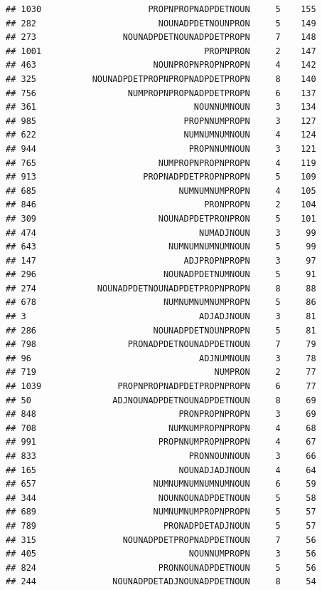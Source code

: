 \documentclass[]{article}
\begin{document}
\begin{verbatim}
## 1030                     PROPNPROPNADPDETNOUN     5    155
## 282                        NOUNADPDETNOUNPRON     5    149
## 273                 NOUNADPDETNOUNADPDETPROPN     7    148
## 1001                                PROPNPRON     2    147
## 463                       NOUNPROPNPROPNPROPN     4    142
## 325           NOUNADPDETPROPNPROPNADPDETPROPN     8    140
## 756                  NUMPROPNPROPNADPDETPROPN     6    137
## 361                               NOUNNUMNOUN     3    134
## 985                             PROPNNUMPROPN     3    127
## 622                             NUMNUMNUMNOUN     4    124
## 944                              PROPNNUMNOUN     3    121
## 765                        NUMPROPNPROPNPROPN     4    119
## 913                     PROPNADPDETPROPNPROPN     5    109
## 685                            NUMNUMNUMPROPN     4    105
## 846                                 PRONPROPN     2    104
## 309                        NOUNADPDETPRONPRON     5    101
## 474                                NUMADJNOUN     3     99
## 643                          NUMNUMNUMNUMNOUN     5     99
## 147                             ADJPROPNPROPN     3     97
## 296                         NOUNADPDETNUMNOUN     5     91
## 274            NOUNADPDETNOUNADPDETPROPNPROPN     8     88
## 678                         NUMNUMNUMNUMPROPN     5     86
## 3                                  ADJADJNOUN     3     81
## 286                       NOUNADPDETNOUNPROPN     5     81
## 798                  PRONADPDETNOUNADPDETNOUN     7     79
## 96                                 ADJNUMNOUN     3     78
## 719                                   NUMPRON     2     77
## 1039               PROPNPROPNADPDETPROPNPROPN     6     77
## 50                ADJNOUNADPDETNOUNADPDETNOUN     8     69
## 848                            PRONPROPNPROPN     3     69
## 708                          NUMNUMPROPNPROPN     4     68
## 991                        PROPNNUMPROPNPROPN     4     67
## 833                              PRONNOUNNOUN     3     66
## 165                            NOUNADJADJNOUN     4     64
## 657                       NUMNUMNUMNUMNUMNOUN     6     59
## 344                        NOUNNOUNADPDETNOUN     5     58
## 689                       NUMNUMNUMPROPNPROPN     5     57
## 789                         PRONADPDETADJNOUN     5     57
## 315                 NOUNADPDETPROPNADPDETNOUN     7     56
## 405                              NOUNNUMPROPN     3     56
## 824                        PRONNOUNADPDETNOUN     5     56
## 244               NOUNADPDETADJNOUNADPDETNOUN     8     54

\end{verbatim}
\end{document}
